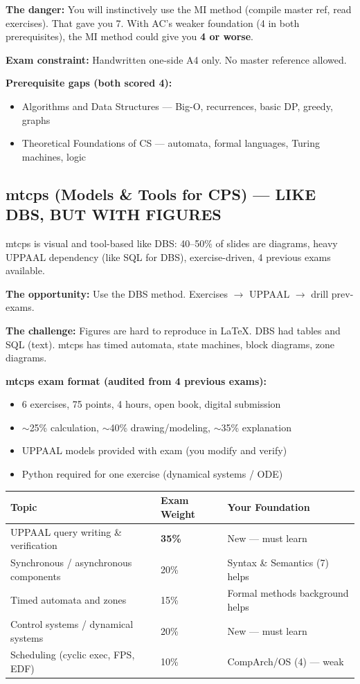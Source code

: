 \documentclass[11pt,a4paper]{article}
\begin{document}
\textbf{The danger:} You will instinctively use the MI method (compile master ref, read exercises). That gave you 7. With AC's weaker foundation (4 in both prerequisites), the MI method could give you \textbf{4 or worse}.

\textbf{Exam constraint:} Handwritten one-side A4 only. No master reference allowed.

\textbf{Prerequisite gaps (both scored 4):}
\begin{itemize}[nosep]
\item Algorithms and Data Structures --- Big-O, recurrences, basic DP, greedy, graphs
\item Theoretical Foundations of CS --- automata, formal languages, Turing machines, logic
\end{itemize}

\subsection{\textcolor{mtcpscolor}{mtcps (Models \& Tools for CPS)} --- LIKE DBS, BUT WITH FIGURES}

mtcps is visual and tool-based like DBS: 40--50\% of slides are diagrams, heavy UPPAAL dependency (like SQL for DBS), exercise-driven, 4 previous exams available.

\textbf{The opportunity:} Use the DBS method. Exercises $\rightarrow$ UPPAAL $\rightarrow$ drill prev-exams.

\textbf{The challenge:} Figures are hard to reproduce in LaTeX. DBS had tables and SQL (text). mtcps has timed automata, state machines, block diagrams, zone diagrams.

\textbf{mtcps exam format (audited from 4 previous exams):}
\begin{itemize}[nosep]
\item 6 exercises, 75 points, 4 hours, open book, digital submission
\item $\sim$25\% calculation, $\sim$40\% drawing/modeling, $\sim$35\% explanation
\item UPPAAL models provided with exam (you modify and verify)
\item Python required for one exercise (dynamical systems / ODE)
\end{itemize}

\begin{center}
\renewcommand{\arraystretch}{1.3}
\begin{tabular}{lll}
\toprule
\textbf{Topic} & \textbf{Exam Weight} & \textbf{Your Foundation} \\
\midrule
UPPAAL query writing \& verification & \textbf{35\%} & New --- must learn \\
Synchronous / asynchronous components & 20\% & Syntax \& Semantics (7) helps \\
Timed automata and zones & 15\% & Formal methods background helps \\
Control systems / dynamical systems & 20\% & New --- must learn \\
Scheduling (cyclic exec, FPS, EDF) & 10\% & CompArch/OS (4) --- weak \\
\bottomrule
\end{tabular}
\end{center}
\end{document}
